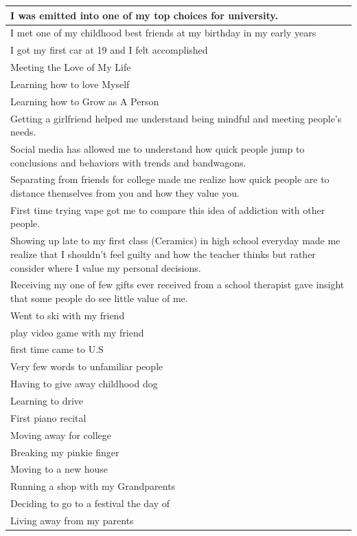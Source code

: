 \documentclass[
  .7em,
  letterpaper,
  DIV=11,
  numbers=noendperiod]{scrartcl}
\begin{document}
\begin{table}
\begin{tabular}{l}
\hline
I was emitted into one of my top choices for university.\\
\hline
I met one of my childhood best friends at my birthday in my early years\\
\hline
I got my first car at 19 and I felt accomplished\\
\hline
Meeting the Love of My Life\\
\hline
Learning how to love Myself\\
\hline
Learning how to Grow as A Person\\
\hline
Getting a girlfriend helped me understand being mindful and meeting people's needs.\\
\hline
Social media has allowed me to understand how quick people jump to conclusions and behaviors with trends and bandwagons.\\
\hline
Separating from friends for college made me realize how quick people are to distance themselves from you and how they value you.\\
\hline
First time trying vape got me to compare this idea of addiction with other people.\\
\hline
Showing up late to my first class (Ceramics) in high school everyday made me realize that I shouldn't feel guilty and how the teacher thinks but rather consider where I value my personal decisions.\\
\hline
Receiving my one of few gifts ever received from a school therapist gave insight that some people do see little value of me.\\
\hline
Went to ski with my friend\\
\hline
play video game with my friend\\
\hline
first time came to U.S\\
\hline
Very few words to unfamiliar people\\
\hline
Having to give away childhood dog\\
\hline
Learning to drive\\
\hline
First piano recital\\
\hline
Moving away for college\\
\hline
Breaking my pinkie finger\\
\hline
Moving to a new house\\
\hline
Running a shop with my Grandparents\\
\hline
Deciding to go to a festival the day of\\
\hline
Living away from my parents\\
\hline

\end{tabular}
\end{table}
\end{document}
